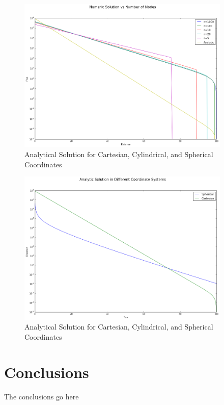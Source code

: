 \documentclass[10pt,peerreviewca]{IEEEtran} %
\begin{document}
	\begin{figure}
		\begin{centering}
		\includegraphics[width=4in]{flux_vs_nodes_one_graph}
		\caption{Analytical Solution for Cartesian, Cylindrical, and Spherical Coordinates}
		\label{fig:many nodes one chart}
		\end{centering}
	\end{figure}

	\begin{figure}
		\begin{centering}
		\includegraphics[width=4in]{different_coordinate_systems}
		\caption{Analytical Solution for Cartesian, Cylindrical, and Spherical Coordinates}
		\label{fig:different coordinate systems}
		\end{centering}
	\end{figure}
	
	\section{Conclusions}
	The conclusions go here
\end{document}
